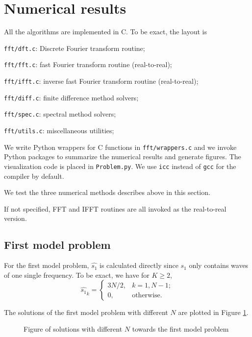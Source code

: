 \documentclass[english, nochinese]{pnote}
\begin{document}
\section{Numerical results}

All the algorithms are implemented in C. To be exact, the layout is
\begin{partlist}
\item \verb"fft/dft.c": Discrete Fourier transform routine;
\item \verb"fft/fft.c": fast Fourier transform routine (real-to-real);
\item \verb"fft/ifft.c": inverse fast Fourier transform routine (real-to-real);
\item \verb"fft/diff.c": finite difference method solvers;
\item \verb"fft/spec.c": spectral method solvers;
\item \verb"fft/utils.c": miscellaneous utilities;
\end{partlist}
We write Python wrappers for C functions in \verb"fft/wrappers.c" and we invoke Python packages to summarize the numerical results and generate figures. The visualization code is placed in \verb"Problem.py". We use \verb"icc" instead of \verb"gcc" for the compiler by default.

We test the three numerical methods describes above in this section.

If not specified, FFT and IFFT routines are all invoked as the real-to-real version.

\subsection{First model problem}

For the first model problem, $\hat{s_1}$ is calculated directly since $s_1$ only contains waves of one single frequency. To be exact, we have for $ K \ge 2 $,
\begin{equation}
\hat{s_1}_k =
\begin{cases}
3 N / 2, & k = 1, N - 1; \\
0, & \text{otherwise}.
\end{cases}
\end{equation}

The solutions of the first model problem with different $N$ are plotted in Figure \ref{Fig:FirstFig}.

\begin{figure}[htbp]
\centering
\scalebox{0.75}{}
\caption{Figure of solutions with different $N$ towards the first model problem}
\label{Fig:FirstFig}
\end{figure}
\end{document}
